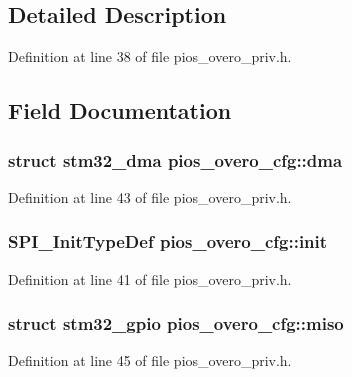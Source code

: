 \subsection{Detailed Description}


Definition at line 38 of file pios\-\_\-overo\-\_\-priv.\-h.



\subsection{Field Documentation}
\hypertarget{structpios__overo__cfg_a16a7dbb7388c47c8b5479da68176de6c}{
\subsubsection[{dma}]{\setlength{\rightskip}{0pt plus 5cm}struct {\bf stm32\-\_\-dma} pios\-\_\-overo\-\_\-cfg\-::dma}}\label{structpios__overo__cfg_a16a7dbb7388c47c8b5479da68176de6c}


Definition at line 43 of file pios\-\_\-overo\-\_\-priv.\-h.

\hypertarget{structpios__overo__cfg_a7eab710432a7a408f6bc9312e5d12e24}{
\subsubsection[{init}]{\setlength{\rightskip}{0pt plus 5cm}S\-P\-I\-\_\-\-Init\-Type\-Def pios\-\_\-overo\-\_\-cfg\-::init}}\label{structpios__overo__cfg_a7eab710432a7a408f6bc9312e5d12e24}


Definition at line 41 of file pios\-\_\-overo\-\_\-priv.\-h.

\hypertarget{structpios__overo__cfg_a4f182bb3911f41c5e505ed81e688c343}{
\subsubsection[{miso}]{\setlength{\rightskip}{0pt plus 5cm}struct {\bf stm32\-\_\-gpio} pios\-\_\-overo\-\_\-cfg\-::miso}}\label{structpios__overo__cfg_a4f182bb3911f41c5e505ed81e688c343}


Definition at line 45 of file pios\-\_\-overo\-\_\-priv.\-h.

